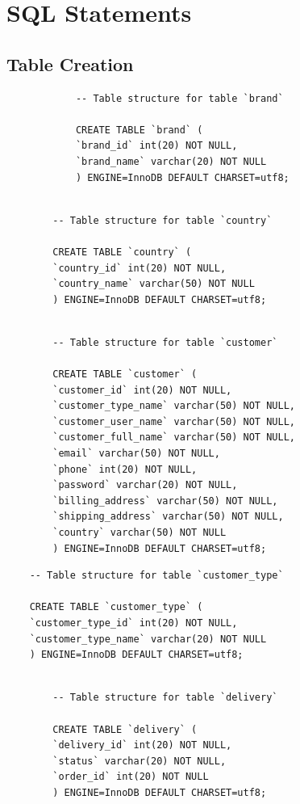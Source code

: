 \documentclass{article}
\begin{document}
	\section{SQL Statements}
		\subsection{Table Creation}
		\begin{verbatim}
			-- Table structure for table `brand`
			
			CREATE TABLE `brand` (
			`brand_id` int(20) NOT NULL,
			`brand_name` varchar(20) NOT NULL
			) ENGINE=InnoDB DEFAULT CHARSET=utf8;
			
		\end{verbatim}
		
		\begin{verbatim}
		-- Table structure for table `country`
		
		CREATE TABLE `country` (
		`country_id` int(20) NOT NULL,
		`country_name` varchar(50) NOT NULL
		) ENGINE=InnoDB DEFAULT CHARSET=utf8;
		
		\end{verbatim}
		
		\begin{verbatim}
		-- Table structure for table `customer`

		CREATE TABLE `customer` (
		`customer_id` int(20) NOT NULL,
		`customer_type_name` varchar(50) NOT NULL,
		`customer_user_name` varchar(50) NOT NULL,
		`customer_full_name` varchar(50) NOT NULL,
		`email` varchar(50) NOT NULL,
		`phone` int(20) NOT NULL,
		`password` varchar(20) NOT NULL,
		`billing_address` varchar(50) NOT NULL,
		`shipping_address` varchar(50) NOT NULL,
		`country` varchar(50) NOT NULL
		) ENGINE=InnoDB DEFAULT CHARSET=utf8;
		\end{verbatim}
		\pagebreak
		\begin{verbatim}
	-- Table structure for table `customer_type`
	
	CREATE TABLE `customer_type` (
	`customer_type_id` int(20) NOT NULL,
	`customer_type_name` varchar(20) NOT NULL
	) ENGINE=InnoDB DEFAULT CHARSET=utf8;
	
		\end{verbatim}
		
		\begin{verbatim}
		-- Table structure for table `delivery`
		
		CREATE TABLE `delivery` (
		`delivery_id` int(20) NOT NULL,
		`status` varchar(20) NOT NULL,
		`order_id` int(20) NOT NULL
		) ENGINE=InnoDB DEFAULT CHARSET=utf8;
		
		\end{verbatim}
		
\end{document}
